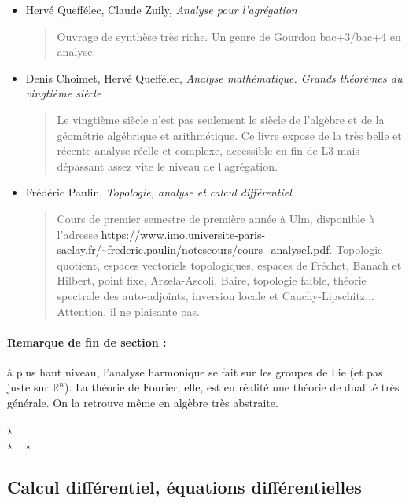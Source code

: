 \documentclass{article}
\def\separateur{\begin{center}
$\star$\\
$\star\quad\star$
\end{center}}
\begin{document}
\begin{itemize}
\item Hervé Queffélec, Claude Zuily, \emph{Analyse pour l'agrégation}
\begin{quote}
Ouvrage de synthèse très riche. Un genre de Gourdon bac+3/bac+4 en analyse.
\end{quote}
\item Denis Choimet, Hervé Queffélec, \emph{Analyse mathématique. Grands théorèmes du vingtième siècle}
\begin{quote}
Le vingtième siècle n'est pas seulement  le siècle de l'algèbre et de la géométrie algébrique et arithmétique. Ce livre expose de la très belle et récente analyse réelle et complexe, accessible en fin de L3 mais dépassant assez vite le niveau de l'agrégation.
\end{quote}
\item Frédéric Paulin, \emph{Topologie, analyse et calcul différentiel}
\begin{quote}
Cours de premier semestre de première année à Ulm, disponible à l'adresse \url{https://www.imo.universite-paris-saclay.fr/~frederic.paulin/notescours/cours_analyseI.pdf}. Topologie quotient, espaces vectoriels topologiques, espaces de Fréchet, Banach et Hilbert, point fixe, Arzela-Ascoli, Baire, topologie faible, théorie spectrale des auto-adjoints, inversion locale et Cauchy-Lipschitz... Attention, il ne plaisante pas. 
\end{quote}
\end{itemize}

\paragraph{Remarque de fin de section : } à plus haut niveau, l'analyse harmonique se fait sur les groupes de Lie (et pas juste sur $\mathbb R^n$). La théorie de Fourier, elle, est en réalité une théorie de dualité très générale. On la retrouve même en algèbre très abstraite.

\separateur
\newpage
\subsection{Calcul différentiel, équations différentielles}
\end{document}
